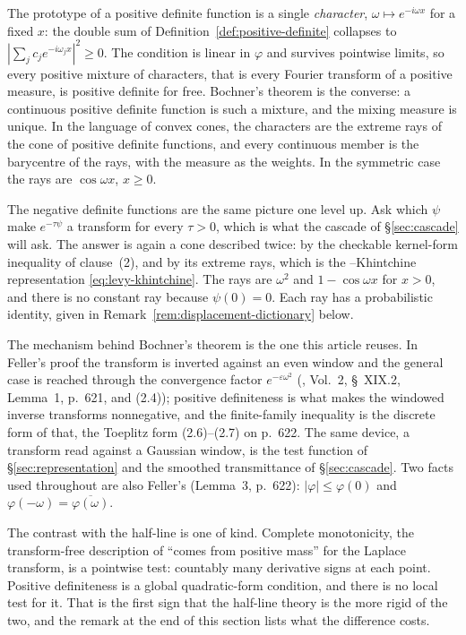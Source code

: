 \begin{remark}
\label{rem:pd-nd-intuition}
The prototype of a positive definite function is a single \emph{character},
$\omega \mapsto e^{-i\omega x}$ for a fixed $x$: the double sum of
Definition~\ref{def:positive-definite} collapses to $|\sum_j c_j e^{-i\omega_j x}|^2 \ge 0$.
The condition is linear in $\varphi$ and survives pointwise limits, so every positive
mixture of characters, that is every Fourier transform of a positive measure, is positive
definite for free. Bochner's theorem is the converse: a continuous positive definite
function is such a mixture, and the mixing measure is unique. In the language of convex
cones, the characters are the extreme rays of the cone of positive definite functions, and
every continuous member is the barycentre of the rays, with the measure as the weights. In
the symmetric case the rays are $\cos\omega x$, $x \ge 0$.

The negative definite functions are the same picture one level up. Ask which $\psi$ make
$e^{-\tau\psi}$ a transform for every $\tau > 0$, which is what the cascade of
\S\ref{sec:cascade} will ask. The answer is again a cone described twice: by the checkable
kernel-form inequality of clause~(2), and by its extreme rays, which is the
\Levy--Khintchine representation \ref{eq:levy-khintchine}. The rays are $\omega^2$ and
$1 - \cos\omega x$ for $x > 0$, and there is no constant ray because $\psi(0) = 0$. Each ray
has a probabilistic identity, given in Remark~\ref{rem:displacement-dictionary} below.

The mechanism behind Bochner's theorem is the one this article reuses. In Feller's proof the
transform is inverted against an even window and the general case is reached through the
convergence factor $e^{-\varepsilon\omega^2}$ (, Vol.~2,
\S~XIX.2, Lemma~1, p.~621, and (2.4)); positive definiteness is what makes the windowed
inverse transforms nonnegative, and the finite-family inequality is the discrete form of
that, the Toeplitz form (2.6)--(2.7) on p.~622. The same device, a transform read against a
Gaussian window, is the test function of \S\ref{sec:representation} and the smoothed
transmittance of \S\ref{sec:cascade}. Two facts used throughout are also Feller's
(Lemma~3, p.~622): $|\varphi| \le \varphi(0)$ and $\varphi(-\omega) = \overline{\varphi(\omega)}$.

The contrast with the half-line is one of kind. Complete monotonicity, the transform-free
description of ``comes from positive mass'' for the Laplace transform, is a pointwise test:
countably many derivative signs at each point. Positive definiteness is a global
quadratic-form condition, and there is no local test for it. That is the first sign that
the half-line theory is the more rigid of the two, and the remark at the end of this section
lists what the difference costs.
\end{remark}


